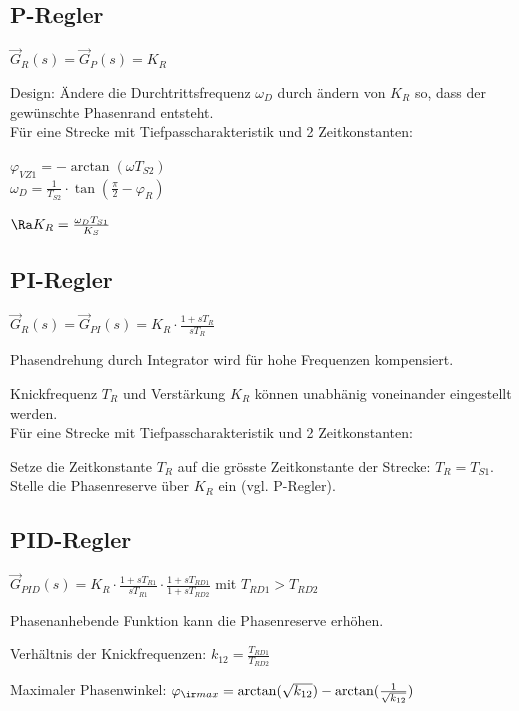 \documentclass[fs, german]{latex4ei_fs}
\begin{document}
\begin{sectionbox}
\subsection{P-Regler}
$\vec G_R (s) = \vec G_P (s) = K_R$

Design: Ändere die Durchtrittsfrequenz $\omega_D$ durch ändern von $K_R$ so, dass der gewünschte Phasenrand entsteht. \\

Für eine Strecke mit Tiefpasscharakteristik und 2 Zeitkonstanten:

$\varphi_{VZ1} = - \arctan (\omega T_{S2})$ \\
$\omega_D = \frac{1}{T_{S2}} \cdot \tan (\frac{\pi}{2} - \varphi_R)$

$\Ra K_R = \frac{\omega_D T_{S1}}{K_S}$
\end{sectionbox}
\begin{sectionbox}
\subsection{PI-Regler}

$\vec G_R (s) = \vec G_{PI} (s) = K_R \cdot \frac{1 + s T_R}{s T_R}$  

Phasendrehung durch Integrator wird für hohe Frequenzen kompensiert.

Knickfrequenz $T_R$ und Verstärkung $K_R$ können unabhänig voneinander eingestellt werden. \\

Für eine Strecke mit Tiefpasscharakteristik und 2 Zeitkonstanten:

Setze die Zeitkonstante $T_R$ auf die grösste Zeitkonstante der Strecke:
$T_R = T_{S1}$. Stelle die Phasenreserve über $K_R$ ein (vgl. P-Regler).

\end{sectionbox}
\begin{sectionbox}

\subsection{PID-Regler}

$\vec G_{PID} (s) = K_R \cdot \frac{1 + s T_{R1}}{s T_{R1}} \cdot \frac{1 + s T_{RD1}}{1 + s T_{RD2}}$ mit $T_{RD1} > T_{RD2}$ 

Phasenanhebende Funktion kann die Phasenreserve erhöhen.

Verhältnis der Knickfrequenzen: $k_{12} = \frac{T_{RD1}}{T_{RD2}}$

Maximaler Phasenwinkel: $\varphi_{\ir max} = \arctan (\sqrt{ k_{12}}) - \arctan (\frac{1}{\sqrt{k_{12}}})$

\end{sectionbox}
\end{document}

